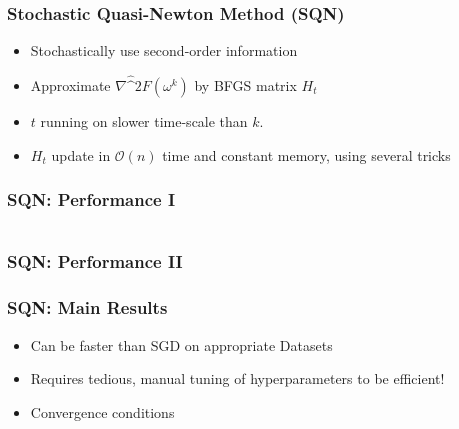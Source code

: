 \documentclass[10pt]{beamer}
\begin{document}
  \begin{frame}\frametitle{Stochastic Quasi-Newton Method (SQN)}
      \begin{itemize}
        \item \alert{Stochastically} use second-order information
        \item Approximate $\nabla \hat^2 F(\omega^{k})$ by BFGS matrix $H_t$
        \item $t$ running on slower time-scale than $k$. 
        \item $H_t$ update in $\mathcal O(n)$ time and constant memory, using several tricks
      \end{itemize}
  \end{frame}


  \begin{frame}
    \frametitle{SQN: Performance I}

      \begin{columns}[T]
      \begin{column}{.5\textwidth}
        \resizebox{\linewidth}{!}{}
      \end{column}\hfill
      \begin{column}{.5\textwidth}
        \resizebox{\linewidth}{!}{}
      \end{column}
    \end{columns}
  \end{frame}

  \begin{frame}
    \frametitle{SQN: Performance II}
    \resizebox{0.8\linewidth}{!}{}
  \end{frame}

  \begin{frame}\frametitle{SQN: Main Results}
    \begin{itemize}
      \item Can be faster than SGD on appropriate Datasets
      \item Requires tedious, manual tuning of hyperparameters to be efficient!
      \item Convergence conditions
    \end{itemize}
  
  \end{frame}
\end{document}
